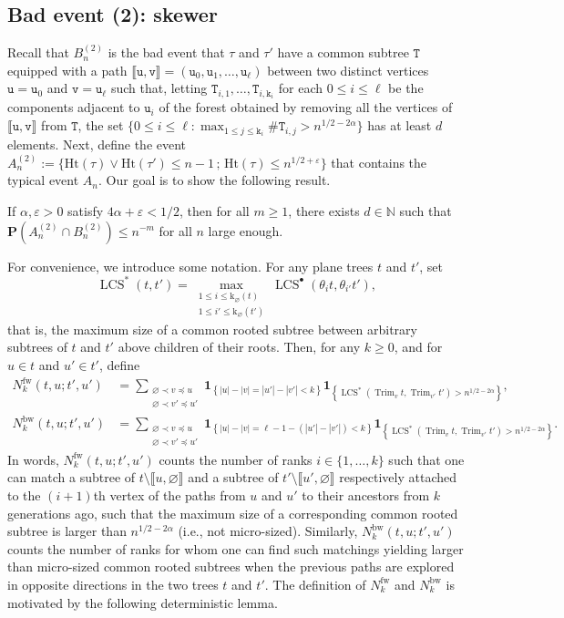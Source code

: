 \documentclass[11pt,reqno]{amsart}
\newcommand{\N}{\mathbb{N}}
\newcommand{\1}{\mathbf{1}}
\newcommand{\0}{\mathbf{0}}
\newcommand{\ttT}{\mathtt{T}}
\newcommand{\ttk}{\mathtt{k}}
\newcommand{\ttu}{\mathtt{u}}
\newcommand{\ttv}{\mathtt{v}}
\newcommand{\e}{\varepsilon}
\newcommand{\I}[1]{{\mathbf 1}_{\left\{#1\right\}}}
\newcommand{\prob}{\mathbf{P}}
\newcommand{\Ht}{\mathrm{Ht}}
\newcommand{\rk}{\mathrm{k}}
\newcommand{\Trim}{\operatorname{Trim}}
\newcommand{\LCS}{\operatorname{LCS}}
\newcommand{\fw}{\mathrm{fw}}
\newcommand{\bw}{\mathrm{bw}}
\begin{document}
\subsection{Bad event (2): skewer}

Recall that $B_n^{(2)}$ is the bad event that $\tau$ and $\tau'$ have a common subtree $\ttT$ equipped with a path $\llbracket \ttu,\ttv\rrbracket=(\ttu_0,\ttu_1,\ldots,\ttu_\ell)$ between two distinct vertices $\ttu=\ttu_0$ and $\ttv=\ttu_\ell$ such that, letting $\ttT_{i,1},\ldots,\ttT_{i,\ttk_i}$ for each $0\leq i\leq \ell$ be the components adjacent to $\ttu_i$ of the forest obtained by removing all the vertices of $\llbracket \ttu,\ttv\rrbracket$ from $\ttT$, the set $\{0\leq i\leq \ell : \max_{1\leq j\leq \ttk_i}\#\ttT_{i,j}>n^{1/2-2\alpha}\}$ has at least $d$ elements. Next, define the event $A_n^{(2)}:=\{\Ht(\tau) \vee \Ht(\tau') \leq n-1 \,;\, \Ht(\tau) \leq n^{1/2+\e}\}$ that contains the typical event $A_n$. Our goal is to show the following result.

\begin{prop}
\label{prop:no_skewers}
    If $\alpha, \e > 0$ satisfy $4\alpha+\varepsilon< 1/2$, then for all $m\geq 1$, there exists $d \in \N$ such that $\prob(A_n^{(2)} \cap B_n^{(2)}) \leq n^{-m}$ for all $n$ large enough. 
\end{prop}

For convenience, we introduce some notation. For any plane trees $t$ and $t'$, set
\[\LCS^*(t,t')=\max_{\substack{1\leq i\leq \rk_\varnothing(t)\\ 1\leq i'\leq \rk_\varnothing(t')}}\LCS^\bullet(\theta_i t,\theta_{i'}t'),\]
that is, the maximum size of a common rooted subtree between arbitrary subtrees of $t$ and $t'$ above children of their roots. Then, for any $k\geq 0$, and for $u\in t$ and $u'\in t'$, define
\begin{align*}
N_{k}^{\fw}(t,u;t',u')&=\sum_{\substack{\varnothing\prec v\preceq u \\ \varnothing \prec v'\preceq u'}}\I{|u|-|v|=|u'|-|v'|<k} \I{\LCS^*(\Trim_v t,\Trim_{v'} t')>n^{1/2-2\alpha}},\\
N_{k}^{\bw}(t,u;t',u')&=\sum_{\substack{\varnothing\prec v\preceq u \\ \varnothing \prec v'\preceq u'}}\I{|u|-|v|=\ell-1-(|u'|-|v'|)<k} \I{\LCS^*(\Trim_v t,\Trim_{v'} t')>n^{1/2-2\alpha}}.
\end{align*}
In words, $N_k^{\fw}(t,u;t',u')$ counts the number of ranks $i\in\{1,\ldots,k\}$ such that one can match a subtree of $t\setminus \llbracket u,\varnothing\rrbracket$ and a subtree of $t'\setminus \llbracket u',\varnothing\rrbracket$ respectively attached to the $(i+1)$th vertex of the paths from $u$ and $u'$ to their ancestors from $k$ generations ago, such that the maximum size of a corresponding common rooted subtree is larger than $n^{1/2-2\alpha}$ (i.e., not micro-sized). Similarly, $N_k^{\bw}(t,u;t',u')$ counts the number of ranks for whom one can find such matchings yielding larger than micro-sized common rooted subtrees when the previous paths are explored in opposite directions in the two trees $t$ and $t'$. The definition of $N_k^{\fw}$ and $N_k^{\bw}$ is motivated by the following deterministic lemma.
\end{document}
